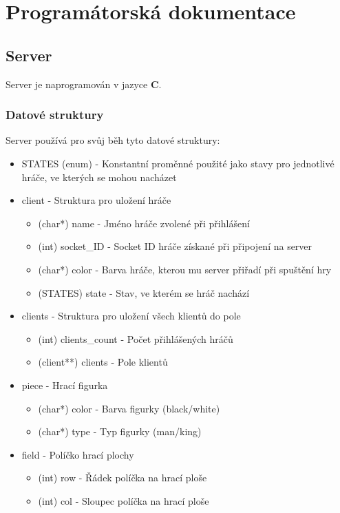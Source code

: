 \documentclass[12pt, a4paper]{article}
\begin{document}
\section{Programátorská dokumentace}
\label{Programátorská dokumentace}
\subsection{Server}
\label{Server}
Server je naprogramován v jazyce \textbf{C}.
\subsubsection{Datové struktury}
\label{Server_Datové_struktury}
Server používá pro svůj běh tyto datové struktury:
\begin{itemize}
\item STATES (enum) - Konstantní proměnné použité jako stavy pro jednotlivé hráče, ve kterých se mohou nacházet
\item client - Struktura pro uložení hráče
	\begin{itemize}
	\item (char*) name - Jméno hráče zvolené při přihlášení
	\item (int) socket\_ID - Socket ID hráče získané při připojení na server
	\item (char*) color - Barva hráče, kterou mu server přiřadí při spuštění hry
	\item (STATES) state - Stav, ve kterém se hráč nachází
	\end{itemize}
\item clients - Struktura pro uložení všech klientů do pole
	\begin{itemize}
	\item (int) clients\_count - Počet přihlášených hráčů
	\item (client**) clients - Pole klientů
	\end{itemize}	 
\item piece - Hrací figurka
	\begin{itemize}
	\item (char*) color - Barva figurky (black/white)
	\item (char*) type - Typ figurky (man/king)
	\end{itemize}	 
\item field - Políčko hrací plochy
	\begin{itemize}
	\item (int) row - Řádek políčka na hrací ploše
	\item (int) col - Sloupec políčka na hrací ploše

\end{itemize}
\end{itemize}
\end{document}
